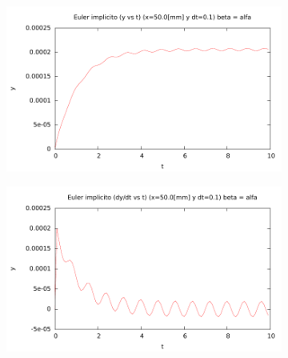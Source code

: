 \begin{center}
\begin{figure} [H]
	\begin{subfigure}[b]{0.3\textwidth}
		\includegraphics{./parte3/graficos/grafico_euler_S2_y_b2.pdf}
		\caption{} 
		\label{fig:eulerS2b2_y}
	\end{subfigure}
	
	\begin{subfigure}[b]{0.3\textwidth}
		\includegraphics{./parte3/graficos/grafico_euler_S2_dy_b2.pdf}
		\caption{} 
		\label{fig:eulerS2b2_dy}
	\end{subfigure}
\end{figure}
\end{center}




